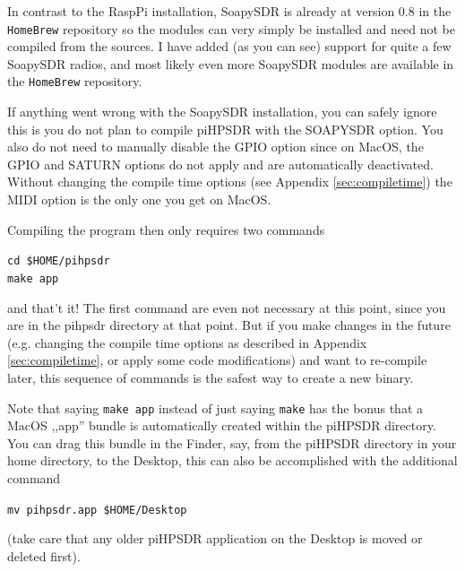 \documentclass[12pt]{book}
\def\grtt#1{\texttt{\color{magenta}#1}}
\begin{document}
In contrast to the RaspPi
installation, SoapySDR is already at version 0.8 in the \texttt{HomeBrew} repository so
the modules can very simply be installed and need not be compiled from the sources.
I have added (as you can see) support for quite a few SoapySDR radios, and most
likely even more SoapySDR modules are available in the \texttt{HomeBrew} repository.

If anything went wrong with the SoapySDR installation, you can safely ignore this is
you do not plan to compile piHPSDR with the SOAPYSDR option. You also do not need
to manually disable the GPIO option since on MacOS, the GPIO and SATURN options
do not apply and are automatically deactivated. Without changing the compile time
options (see Appendix \ref{sec:compiletime}) the MIDI option is the only one you get
on MacOS.

Compiling the program then only requires two commands

\grtt{cd \$HOME/pihpsdr} \\
\grtt{make app}

and that't it! The first command are even not necessary at this point,
since you are in the pihpsdr
directory at that point.
But if you make changes in the future (e.g. changing the compile time options as described in
Appendix \ref{sec:compiletime}, or apply some code modifications)
and want to re-compile later, this sequence of commands is the safest way to create a new binary.

Note that saying \texttt{make app} instead of just saying \texttt{make} has the bonus
that a MacOS ,,app'' bundle is automatically created within the piHPSDR directory.
You can drag this bundle in the Finder, say, from the piHPSDR directory in your
home directory, to the Desktop, this can also be accomplished with the additional command

\grtt{mv pihpsdr.app \$HOME/Desktop}

(take care that any older piHPSDR application on the Desktop is moved or deleted first).
\end{document}
